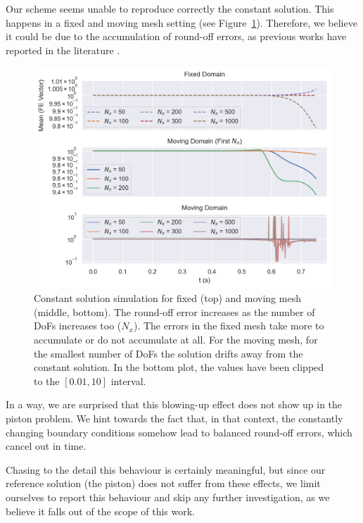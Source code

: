 \documentclass[../../thesis.tex]{subfiles}
\begin{document}
Our scheme seems unable to reproduce correctly the constant solution.
This happens in a fixed and moving mesh setting (see Figure~\ref{fig:ale_effect_constant_solution}).
Therefore, we believe it could be due to the accumulation of round-off errors, 
as previous works have reported in the literature \cite{liu2019balancing}.
\begin{figure}[h]
    \centering
    \includegraphics[width=1\columnwidth]{research_project/piston/figures/ale_effect/mean_fe_comparison_constant_solution.png}
    \caption{Constant solution simulation for fixed (top) and moving mesh (middle, bottom).
    The round-off error increases as the number of DoFs increases too ($N_x$). 
    The errors in the fixed mesh take more to accumulate or do not accumulate at all.
    For the moving mesh, for the smallest number of DoFs the solution drifts away from the constant solution.
    In the bottom plot, the values have been clipped to the $[0.01, 10]$ interval.}
    \label{fig:ale_effect_constant_solution}
\end{figure}

In a way, we are surprised that this blowing-up effect does not show up in the piston problem.
We hint towards the fact that, in that context, the constantly changing boundary conditions
somehow lead to balanced round-off errors, which cancel out in time.

Chasing to the detail this behaviour is certainly meaningful, 
but since our reference solution (the piston) does not suffer from these effects,
we limit ourselves to report this behaviour and skip any further investigation, 
as we believe it falls out of the scope of this work. 
\end{document}
